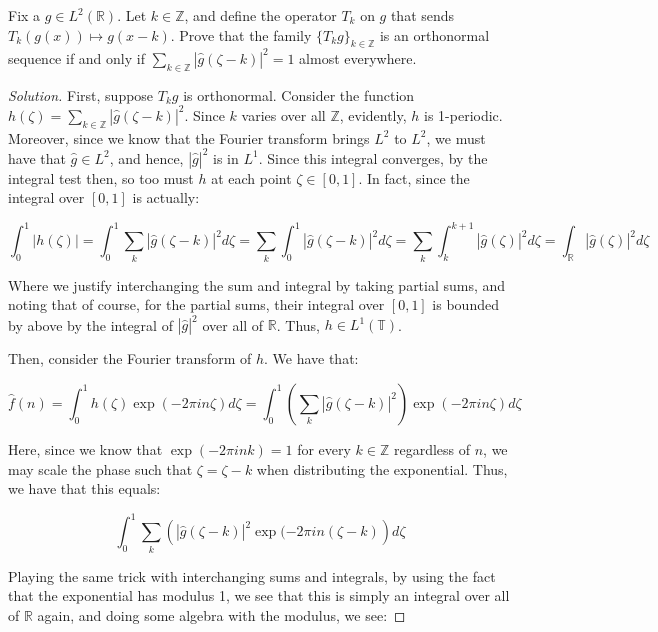 \documentclass[10pt]{article}
\newenvironment{problem}[2][]{\begin{trivlist}
\item[\hskip \labelsep {\bfseries #1}\hskip \labelsep {\bfseries #2.}]}{\end{trivlist}}
\begin{document}
\begin{problem}{Question 12}

Fix a $g \in L^2(\mathbb{R})$. Let $k \in \mathbb{Z}$, and define the operator $T_k$ on $g$ that sends $T_k (g(x)) \mapsto g(x - k)$. Prove that the family $\{ T_k g \}_{k \in \mathbb{Z}}$ is an orthonormal sequence if and only if $\sum_{k \in \mathbb{Z}} | \hat{g}(\zeta - k)|^2 = 1$ almost everywhere.

\end{problem}

\begin{proof}[Solution]

First, suppose $T_k g$ is orthonormal. Consider the function $h(\zeta) = \sum_{k \in \mathbb{Z}} | \hat{g}(\zeta - k)|^2$. Since $k$ varies over all $\mathbb{Z}$, evidently, $h$ is 1-periodic. Moreover, since we know that the Fourier transform brings $L^2$ to $L^2$, we must have that $\hat{g} \in L^2$, and hence, $|\hat{g}|^2$ is in $L^1$. Since this integral converges, by the integral test then, so too must $h$ at each point $\zeta \in [0,1]$. In fact, since the integral over $[0,1]$ is actually:

$$\int_0^1 |h(\zeta)| = \int_0^1 \sum_{k} | \hat{g}(\zeta - k) |^2 d\zeta = \sum_{k} \int_0^1 | \hat{g}(\zeta - k )|^2 d\zeta = \sum_{k} \int_k^{k+1} | \hat{g}(\zeta)|^2 d\zeta = \int_{\mathbb{R}} |\hat{g}(\zeta)|^2 d\zeta$$

Where we justify interchanging the sum and integral by taking partial sums, and noting that of course, for the partial sums, their integral over $[0,1]$ is bounded by above by the integral of $|\hat{g}|^2$ over all of $\mathbb{R}$. Thus, $h \in L^1(\mathbb{T})$.

Then, consider the Fourier transform of $h$. We have that:

$$ \hat{f}(n) = \int_0^1 h(\zeta) \exp(-2 \pi i n \zeta) d\zeta = \int_0^1 \left (\sum_{k} |\hat{g}(\zeta - k)|^2 \right) \exp(-2 \pi i n \zeta) d\zeta $$ 

Here, since we know that $\exp(-2\pi i nk) = 1$ for every $k \in \mathbb{Z}$ regardless of $n$, we may scale the phase such that $\zeta = \zeta - k$ when distributing the exponential. Thus, we have that this equals:

$$ \int_0^1 \sum_{k} \left( |\hat{g}(\zeta - k)|^2 \exp(-2 \pi in (\zeta - k) \right) d\zeta $$

Playing the same trick with interchanging sums and integrals, by using the fact that the exponential has modulus 1, we see that this is simply an integral over all of $\mathbb{R}$ again, and doing some algebra with the modulus, we see:


\end{proof}
\end{document}
